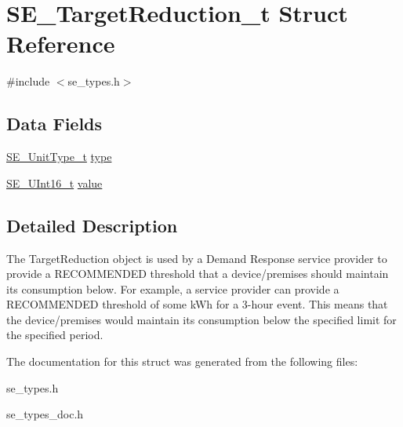 \hypertarget{structSE__TargetReduction__t}{}\section{S\+E\+\_\+\+Target\+Reduction\+\_\+t Struct Reference}
\label{structSE__TargetReduction__t}


{\ttfamily \#include $<$se\+\_\+types.\+h$>$}

\subsection*{Data Fields}
\begin{DoxyCompactItemize}
\item 
\hyperlink{group__UnitType_ga402dc1288733e4df30c6ae69e947cebe}{S\+E\+\_\+\+Unit\+Type\+\_\+t} \hyperlink{group__TargetReduction_ga62a38286d35648e7858f31c933bdbefe}{type}
\item 
\hyperlink{group__UInt16_gac68d541f189538bfd30cfaa712d20d29}{S\+E\+\_\+\+U\+Int16\+\_\+t} \hyperlink{group__TargetReduction_ga0e051bb112da6ceb397749dd75275896}{value}
\end{DoxyCompactItemize}


\subsection{Detailed Description}
The Target\+Reduction object is used by a Demand Response service provider to provide a R\+E\+C\+O\+M\+M\+E\+N\+D\+ED threshold that a device/premises should maintain its consumption below. For example, a service provider can provide a R\+E\+C\+O\+M\+M\+E\+N\+D\+ED threshold of some k\+Wh for a 3-\/hour event. This means that the device/premises would maintain its consumption below the specified limit for the specified period. 

The documentation for this struct was generated from the following files\+:\begin{DoxyCompactItemize}
\item 
se\+\_\+types.\+h\item 
se\+\_\+types\+\_\+doc.\+h\end{DoxyCompactItemize}

